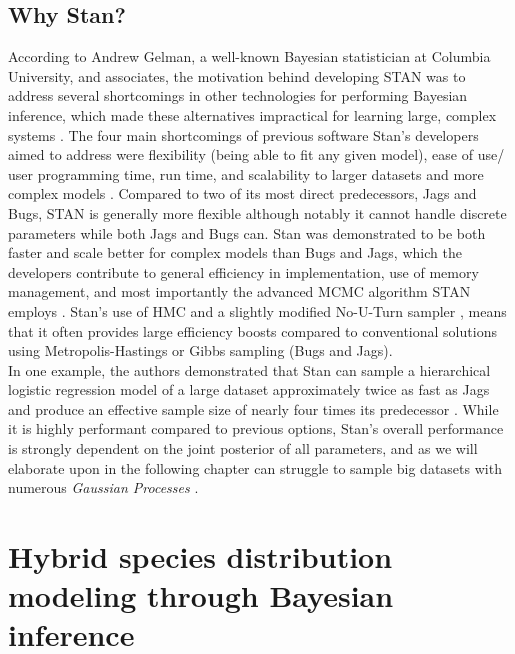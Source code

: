 \documentclass[
  12pt,
  oneside]{book}
\theoremstyle{definition}
\theoremstyle{definition}
\theoremstyle{definition}
\theoremstyle{remark}
\begin{document}
\hypertarget{why-stan}{%
\section{Why Stan?}\label{why-stan}}

According to Andrew Gelman, a well-known Bayesian statistician at Columbia University, and associates, the motivation behind developing STAN was to address several shortcomings in other technologies for performing Bayesian inference, which made these alternatives impractical for learning large, complex systems \citep{Gelman2015}.
The four main shortcomings of previous software Stan's developers aimed to address were flexibility (being able to fit any given model), ease of use/ user programming time, run time, and scalability to larger datasets and more complex models \citep{Gelman2015}.
Compared to two of its most direct predecessors, Jags and Bugs, STAN is generally more flexible although notably it cannot handle discrete parameters while both Jags and Bugs can.
Stan was demonstrated to be both faster and scale better for complex models than Bugs and Jags, which the developers contribute to general efficiency in implementation, use of memory management, and most importantly the advanced MCMC algorithm STAN employs \citep{Gelman2015}.
Stan's use of HMC \citep{Brooks2011} and a slightly modified No-U-Turn sampler \citep{Homan2014}, means that it often provides large efficiency boosts compared to conventional solutions using Metropolis-Hastings or Gibbs sampling (Bugs and Jags).\\
In one example, the authors demonstrated that Stan can sample a hierarchical logistic regression model of a large dataset approximately twice as fast as Jags and produce an effective sample size of nearly four times its predecessor \citep{Gelman2015}.
While it is highly performant compared to previous options, Stan's overall performance is strongly dependent on the joint posterior of all parameters, and as we will elaborate upon in the following chapter can struggle to sample big datasets with numerous \emph{Gaussian Processes} \citep{Gelman2015}.

\hypertarget{hybrid-species-distribution-modeling-through-bayesian-inference}{%
\chapter{Hybrid species distribution modeling through Bayesian inference}\label{hybrid-species-distribution-modeling-through-bayesian-inference}}
\end{document}
